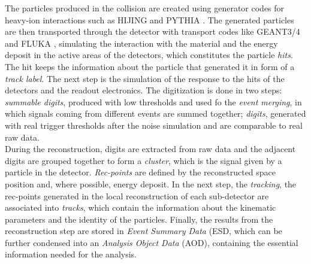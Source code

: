 The particles produced in the collision are created using generator codes for heavy-ion interactions such as HIJING \cite{hijing} and PYTHIA \cite{pythia}. The generated particles are  then transported through the detector with transport codes like GEANT3/4 \cite{geant} and FLUKA \cite{fluka}, simulating the interaction with the material and the energy deposit in the active areas of the detectors, which constitutes the particle \textit{hits}. The hit keeps the information about the particle that generated it in form of a \textit{track label}. The next step is the simulation of the response to the hits of the detectors and the readout electronics. The digitization is done in two steps: \textit{summable digits}, produced with low thresholds and used fo the \textit{event merging}, in which signals coming from different events are summed together; \textit{digits}, generated with real trigger thresholds after the noise simulation and are comparable to real raw data.\\
During the reconstruction, digits are extracted from raw data and the adjacent digits are grouped together to form  a \textit{cluster}, which is the signal given by a particle in the detector. \textit{Rec-points} are defined by the reconstructed space position and, where possible, energy deposit. In the next step, the \textit{tracking}, the rec-points generated in the local reconstruction of each sub-detector are associated into \textit{tracks}, which contain the information about the kinematic parameters and the identity of the particles. Finally, the results from the reconstruction step are stored in \textit{Event Summary Data} (ESD, which can be further condensed into an \textit{Analysis Object Data} (AOD), containing the essential information needed for the analysis.
